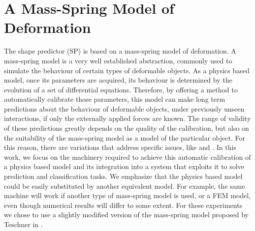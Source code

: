 \documentclass[journal]{IEEEtran}
\newcommand{\sref}[1]{Section~\ref{#1}}
\begin{document}
\section{A Mass-Spring Model of Deformation}
The shape predictor (SP) is based on a mass-spring model of deformation.  A mass-spring model is a very well established abstraction, commonly used to simulate the behaviour of certain types of deformable objects.  As a physics based model, once its parameters are acquired, its behaviour is determined by the evolution of a set of differential equations.  Therefore, by offering a method to automatically calibrate those parameters, this model can make long term predictions about the behaviour of deformable objects, under previously unseen interactions, if only the externally applied forces are known.  The range of validity of these predictions greatly depends on the quality of the calibration, but also on the suitability of the mass-spring model as a model of the particular object.  For this reason, there are variations that address specific issues, like \cite{Bourguignon2000} and \cite{Teschner2004}.  In this work, we focus on the machinery required to achieve this automatic calibration of a physics based model and its integration into a system that exploits it to solve prediction and classification tasks.  We emphasize that the physics based model could be easily substituted by another equivalent model.  For example, the same machine will work if another type of mass-spring model is used, or a FEM model, even though numerical results will differ to some extent.  For these experiments we chose to use a slightly modified version of the mass-spring model proposed by Teschner in \cite{Teschner2004}.

\end{document}
